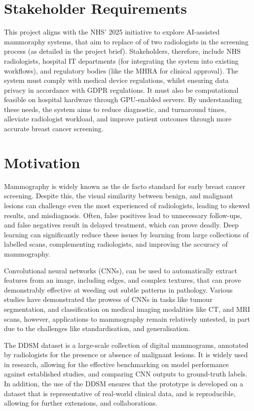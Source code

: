 \documentclass[main]{subfiles}
\begin{document}
\section{Stakeholder Requirements}
\label{sec:intro_stakeholder_requirements}
This project aligns with the NHS' 2025 initiative to explore AI-assisted mammoraphy systems, that aim to replace of of two radiologists in the screening process (as detailed in the project brief). Stakeholders, therefore, include NHS radiologists, hospital IT departments (for integrating the system into existing workflows), and regulatory bodies (like the MHRA for clinical approval). The system must comply with medical device regulations, whilst ensuring data privacy in accordance with GDPR regulations. It must also be computational feasible on hospital hardware through GPU-enabled servers. By understanding these needs, the system aims to reduce diagnostic, and turnaround times, alleviate radiologist workload, and improve patient outcomes through more accurate breast cancer screening.

\section{Motivation}
\label{sec:intro_motivation}
Mammography is widely known as the de facto standard for early breast cancer screening. Despite this, the visual similarity between benign, and malignant lesions can challenge even the most experienced of radiologists, leading to skewed results, and misdiagnosis. Often, false positives lead to unnecessary follow-ups, and false negatives result in delayed treatment, which can prove deadly. Deep learning can significantly reduce these issues by learning from large collections of labelled scans, complementing radiologists, and improving the accuracy of mammography.

Convolutional neural networks (CNNs), can be used to automatically extract features from an image, including edges, and complex textures, that can prove demonstrably effective at weeding out subtle patterns in pathology. Various studies have demonstrated the prowess of CNNs in tasks like tumour segmentation, and classification on medical imaging modalities like CT, and MRI scans, however, applications to mammography remain relatively untested, in part due to the challenges like standardisation, and generalisation.

The DDSM dataset is a large-scale collection of digital mammograms, annotated by radiologists for the presence or absence of malignant lesions. It is widely used in research, allowing for the effective benchmarking on model performance against established studies, and comparing CNN outputs to ground-truth labels. In addition, the use of the DDSM ensures that the prototype is developed on a dataset that is representative of real-world clinical data, and is reproducible, allowing for further extensions, and collaborations.
\end{document}
